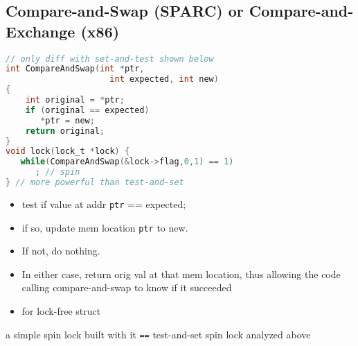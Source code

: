 \documentclass[8pt,a4paper,landscape]{extarticle}
\begin{document}
\begin{multicols*}{3}
\section*{Compare-and-Swap (SPARC) or Compare-and-Exchange (x86)}
\begin{minipage}{.65\linewidth}
\begin{lstlisting}[language=c]
// only diff with set-and-test shown below
int CompareAndSwap(int *ptr,
                     int expected, int new)
{
    int original = *ptr;
    if (original == expected)
       *ptr = new;
    return original;
}
void lock(lock_t *lock) {
   while(CompareAndSwap(&lock->flag,0,1) == 1)
      ; // spin
} // more powerful than test-and-set
\end{lstlisting}
\end{minipage}
\begin{minipage}{.35\linewidth}
  \flushleft
  \begin{itemize}
  \item test if value at addr \texttt{ptr} == expected;
  \item if so, update mem location \texttt{ptr} to new.
  \item If not, do nothing.
  \item In either case, return orig val at that mem location, thus allowing the code calling compare-and-swap to know if it succeeded
  \item for lock-free struct
  \end{itemize}
\end{minipage}
a simple spin lock built with it \texttt{==} test-and-set spin lock analyzed above

\end{multicols*}
\end{document}
